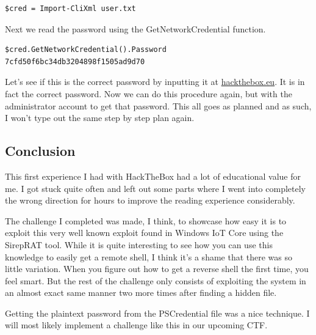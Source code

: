 \documentclass[../main.tex]{subfiles}
\begin{document}
\begin{lstlisting}
$cred = Import-CliXml user.txt
\end{lstlisting}

Next we read the password using the GetNetworkCredential function.

\begin{lstlisting}
$cred.GetNetworkCredential().Password
7cfd50f6bc34db3204898f1505ad9d70
\end{lstlisting}

Let's see if this is the correct password by inputting it at \url{hackthebox.eu}. It is in fact the correct password. Now we can do this procedure again, but with the administrator account to get that password. This all goes as planned and as such, I won't type out the same step by step plan again.

\newpage
\subsection{Conclusion}

This first experience I had with HackTheBox had a lot of educational value for me. I got stuck quite often and left out some parts where I went into completely the wrong direction for hours to improve the reading experience considerably.

The challenge I completed was made, I think, to showcase how easy it is to exploit this very well known exploit found in Windows IoT Core using the SirepRAT tool. While it is quite interesting to see how you can use this knowledge to easily get a remote shell, I think it's a shame that there was so little variation. When you figure out how to get a reverse shell the first time, you feel smart. But the rest of the challenge only consists of exploiting the system in an almost exact same manner two more times after finding a hidden file. 

Getting the plaintext password from the PSCredential file was a nice technique. I will most likely implement a challenge like this in our upcoming CTF.
\end{document}
